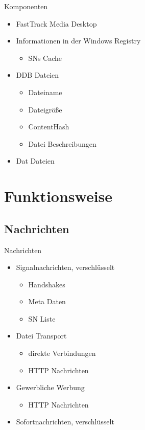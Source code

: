 \documentclass[ucs,9pt]{beamer}
\begin{document}
\begin{frame}{Komponenten}
\begin{itemize}
	\item FastTrack Media Desktop
	\item Informationen in der Windows Registry
		\begin{itemize}
		\item SNs Cache
		\end{itemize}
	\item DDB Dateien
		\begin{itemize}
		\item Dateiname
		\item Dateigröße
		\item ContentHash
		\item Datei Beschreibungen
		\end{itemize}
	\item Dat Dateien
\end{itemize}
\end{frame}

\section{Funktionsweise}

\subsection{Nachrichten}

\begin{frame}{Nachrichten}
\begin{itemize}
\item Signalnachrichten, verschlüsselt
	\begin{itemize}
	\item Handshakes
	\item Meta Daten
	\item SN Liste
	\end{itemize}
\item Datei Transport
	\begin{itemize}
	\item direkte Verbindungen
	\item HTTP Nachrichten
	\end{itemize}
\item Gewerbliche Werbung
	\begin{itemize}
	\item HTTP Nachrichten
	\end{itemize}
\item Sofortnachrichten, verschlüsselt
\end{itemize}
\end{frame}
\end{document}
